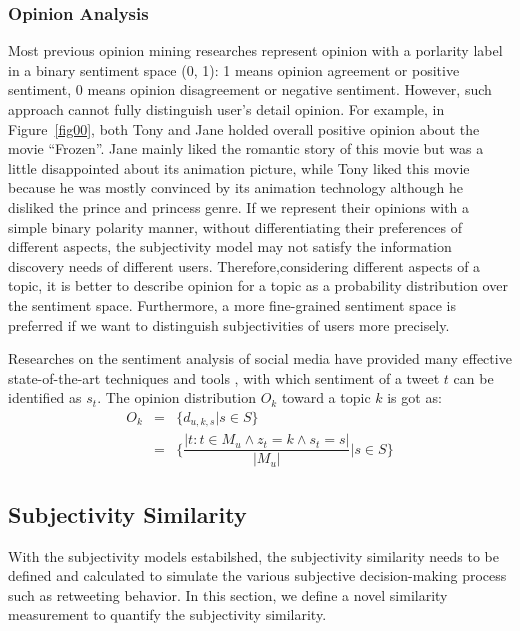 \documentclass[letterpaper]{article}
\begin{document}
\subsubsection{Opinion Analysis}
\label{opinion}

Most previous opinion mining researches \cite{liu2012sentiment} represent opinion with a porlarity label in a binary sentiment space (0, 1): 1 means opinion agreement or positive sentiment, 0 means opinion disagreement or negative sentiment. However, such approach cannot fully distinguish user's detail opinion. For example, in Figure~\ref{fig00}, both Tony and Jane holded overall positive opinion about the movie ``Frozen''. Jane mainly liked the romantic story of this movie but was a little disappointed about its animation picture, while Tony liked this movie because he was mostly convinced by its animation technology although he disliked the prince and princess genre. If we represent their opinions with a simple binary polarity manner, without differentiating their preferences of different aspects, the subjectivity model may not satisfy the information discovery needs of different users. Therefore,considering different aspects of a topic, it is better to describe opinion for a topic as a probability distribution over the sentiment space. Furthermore, a more fine-grained sentiment space is preferred if we want to distinguish subjectivities of users more precisely.

Researches on the sentiment analysis of social media have provided many effective state-of-the-art techniques and tools \cite{thelwall2010sentiment,hu2013unsupervised}, with which sentiment of a tweet $ t $ can be identified as $ s_t $. The opinion distribution $ O_k $ toward a topic $ k $ is got as:
\begin{eqnarray}
O_k &= & \{ d_{u,k,s}|s \in S \}\\
  &=& \{ \dfrac{|t:t \in M_u \wedge z_t=k \wedge s_t=s|}{|M_u|}|s \in S\}
\end{eqnarray}

\subsection{Subjectivity Similarity}
\label{similarity}

With the subjectivity models estabilshed, the subjectivity similarity needs to be defined and calculated to simulate the various subjective decision-making process such as retweeting behavior. 
In this section, we define a novel similarity measurement to quantify the subjectivity similarity. 
 
\end{document}
